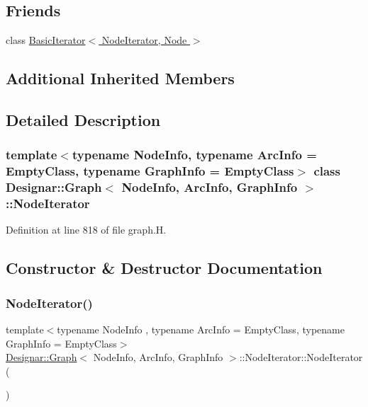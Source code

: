 \subsection*{Friends}
\begin{DoxyCompactItemize}
\item 
class \hyperlink{class_designar_1_1_graph_1_1_node_iterator_a21dc6ae614d097ff896e9e8e422d8f3c}{Basic\+Iterator$<$ Node\+Iterator, Node $>$}
\end{DoxyCompactItemize}
\subsection*{Additional Inherited Members}


\subsection{Detailed Description}
\subsubsection*{template$<$typename Node\+Info, typename Arc\+Info = Empty\+Class, typename Graph\+Info = Empty\+Class$>$\newline
class Designar\+::\+Graph$<$ Node\+Info, Arc\+Info, Graph\+Info $>$\+::\+Node\+Iterator}



Definition at line 818 of file graph.\+H.



\subsection{Constructor \& Destructor Documentation}
\mbox{\label{class_designar_1_1_graph_1_1_node_iterator_a0449a6ba6cd5d43c04567210a8a064b1}} 
\subsubsection{\texorpdfstring{Node\+Iterator()}{NodeIterator()}\hspace{0.1cm}{\footnotesize\ttfamily [1/5]}}
{\footnotesize\ttfamily template$<$typename Node\+Info , typename Arc\+Info  = Empty\+Class, typename Graph\+Info  = Empty\+Class$>$ \\
\hyperlink{class_designar_1_1_graph}{Designar\+::\+Graph}$<$ Node\+Info, Arc\+Info, Graph\+Info $>$\+::Node\+Iterator\+::\+Node\+Iterator (\begin{DoxyParamCaption}{ }\end{DoxyParamCaption})\hspace{0.3cm}{\ttfamily [inline]}}



